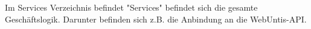 
Im Services Verzeichnis befindet "Services" befindet sich die gesamte Geschäftslogik. Darunter befinden sich z.B. die Anbindung an die WebUntis-API.